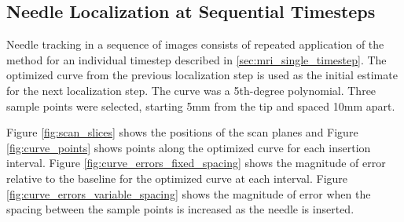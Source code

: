 



\subsection{Needle Localization at Sequential Timesteps}
Needle tracking in a sequence of images consists of repeated application of the method for an individual timestep described in \ref{sec:mri_single_timestep}. The optimized curve from the previous localization step is used as the initial estimate for the next localization step. The curve was a 5th-degree polynomial. Three sample points were selected, starting 5mm from the tip and spaced 10mm apart.

Figure \ref{fig:scan_slices} shows the positions of the scan planes and Figure \ref{fig:curve_points} shows points along the optimized curve for each insertion interval. Figure \ref{fig:curve_errors_fixed_spacing} shows the magnitude of error relative to the baseline for the optimized curve at each interval. Figure \ref{fig:curve_errors_variable_spacing} shows the magnitude of error when the spacing between the sample points is increased as the needle is inserted.


